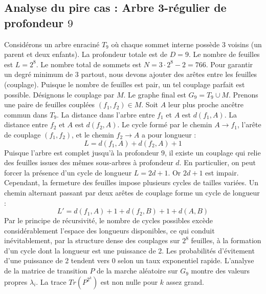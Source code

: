 \documentclass[11pt,a4paper]{article}
\begin{document}
\subsection{Analyse du pire cas : Arbre 3-régulier de profondeur $9$}
Considérons un arbre enraciné $T_9$ où chaque sommet interne possède 3 voisins (un parent et deux enfants).
La profondeur totale est de $D = 9$.
Le nombre de feuilles est $L = 2^{8}$.
Le nombre total de sommets est $N = 3 \cdot 2^{8} - 2 = 766$.
Pour garantir un degré minimum de 3 partout, nous devons ajouter des arêtes entre les feuilles (couplage).
Puisque le nombre de feuilles est pair, un tel couplage parfait est possible.
Désignons le couplage par $M$. Le graphe final est $G_9 = T_9 \cup M$.
Prenons une paire de feuilles couplées $(f_1, f_2) \in M$.
Soit $A$ leur plus proche ancêtre commun dans $T_9$.
La distance dans l'arbre entre $f_1$ et $A$ est $d(f_1, A)$.
La distance entre $f_2$ et $A$ est $d(f_2, A)$.
Le cycle formé par le chemin $A \to f_1$, l'arête de couplage $(f_1, f_2)$, et le chemin $f_2 \to A$ a pour longueur :
$$ L = d(f_1, A) + d(f_2, A) + 1 $$
Puisque l'arbre est complet jusqu'à la profondeur $9$, il existe un couplage qui relie des feuilles issues des mêmes sous-arbres à profondeur $d$.
En particulier, on peut forcer la présence d'un cycle de longueur $L = 2d + 1$. Or $2d+1$ est impair.
Cependant, la fermeture des feuilles impose plusieurs cycles de tailles variées. Un chemin alternant passant par deux arêtes de couplage forme un cycle de longueur :
$$ L' = d(f_1, A) + 1 + d(f_2, B) + 1 + d(A, B) $$
Par le principe de récursivité, le nombre de cycles possibles excède considérablement l'espace des longueurs disponibles, ce qui conduit inévitablement, par la structure dense des couplages sur $2^{8}$ feuilles, à la formation d'un cycle dont la longueur est une puissance de 2. Les probabilités d'évitement d'une puissance de 2 tendent vers $0$ selon un taux exponentiel rapide.
L'analyse de la matrice de transition $P$ de la marche aléatoire sur $G_9$ montre des valeurs propres $\lambda_i$. La trace $Tr(P^{2^k})$ est non nulle pour $k$ assez grand.
\end{document}
